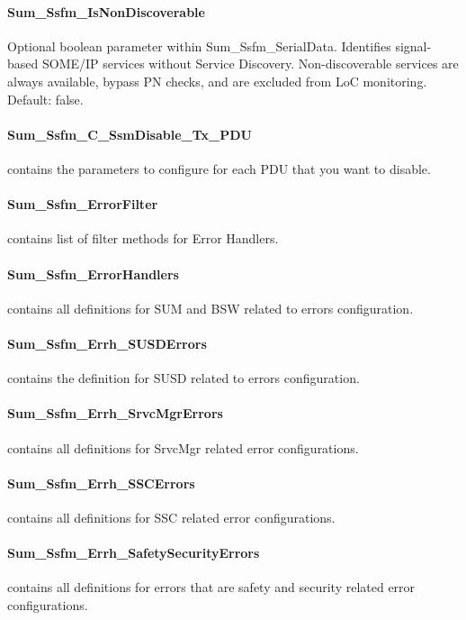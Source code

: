 \paragraph{Sum\_Ssfm\_IsNonDiscoverable} Optional boolean parameter within Sum\_Ssfm\_SerialData. Identifies signal-based SOME/IP services without Service Discovery. Non-discoverable services are always available, bypass PN checks, and are excluded from LoC monitoring. Default: false.

\paragraph{Sum\_Ssfm\_C\_SsmDisable\_Tx\_PDU} contains the parameters to configure for each PDU that you want to disable.

\paragraph{Sum\_Ssfm\_ErrorFilter} contains list of filter methods for Error Handlers.

\paragraph{Sum\_Ssfm\_ErrorHandlers} contains all definitions for SUM and BSW related to errors configuration.

\paragraph{Sum\_Ssfm\_Errh\_SUSDErrors} contains the definition for SUSD related to errors configuration.

\paragraph{Sum\_Ssfm\_Errh\_SrvcMgrErrors} contains all definitions for SrvcMgr related error configurations.

\paragraph{Sum\_Ssfm\_Errh\_SSCErrors} contains all definitions for SSC related error configurations.

\paragraph{Sum\_Ssfm\_Errh\_SafetySecurityErrors} contains all definitions for errors that are safety and security related error configurations.

